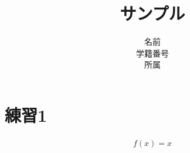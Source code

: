 \documentclass[a4paper,12pt]{jsarticle}
\title{サンプル}
\author{名前\\学籍番号\\所属}
\date{}
\begin{document}
\maketitle

\section{練習1}

\begin{align}
    f(x)=x
\end{align}
\end{document}
